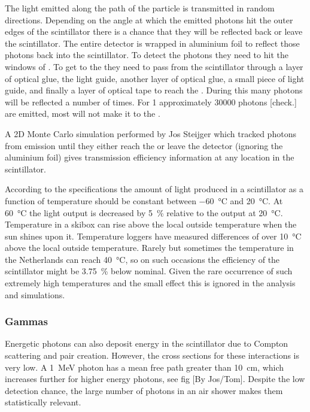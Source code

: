 The light emitted along
the path of the particle is transmitted in random directions. Depending
on the angle at which the emitted photons hit the outer edges of the
scintillator there is a chance that they will be reflected back or leave
the scintillator. The entire detector is wrapped in aluminium foil
to reflect those photons back into the scintillator. To
detect the photons they need to hit the windows of \pmt. To get to the
\pmt they need to pass from the scintillator through a layer of optical
glue, the light guide, another layer of optical glue, a small piece of
light guide, and finally a layer of optical tape to reach the \pmt.
During this many photons will be reflected a number of times. For
\SI{1}{\mip} approximately 30000 photons [check.] are emitted, most will
not make it to the \pmt.


A 2D Monte Carlo simulation performed by Jos Steijger which tracked
photons from emission until they either reach the \pmt or leave the
detector (ignoring the aluminium foil) gives transmission efficiency
information at any location in the scintillator.



According to the specifications the amount of light produced in a scintillator as a function of temperature should be constant between \SI{-60}{\degreeCelsius} and \SI{20}{\degreeCelsius}. At \SI{60}{\degreeCelsius} the light output is decreased by \SI{5}{\percent} relative to the output at \SI{20}{\degreeCelsius}. Temperature in a skibox can rise above the local outside temperature when the sun shines upon it. Temperature loggers have measured differences of over \SI{10}{\degreeCelsius} above the local outside temperature. Rarely but sometimes the temperature in the Netherlands can reach \SI{40}{\degreeCelsius}, so on such occasions the efficiency of the scintillator might be \SI{3.75}{\percent} below nominal. Given the rare occurrence of such extremely high temperatures and the small effect this is ignored in the analysis and simulations.



\subsubsection{Gammas}


Energetic photons can also deposit energy in the scintillator due to Compton scattering and pair creation. However, the cross sections for these interactions is very low. A \SI{1}{\MeV} photon  has a mean free path greater than \SI{10}{\centi\meter}, which increases further for higher energy photons, see fig [By Jos/Tom]. Despite the low detection chance, the large number of photons in an air shower makes them statistically relevant.


